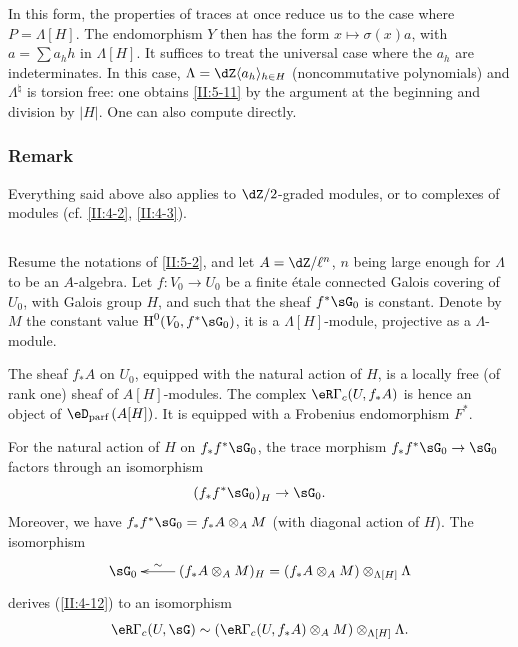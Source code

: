 In this form, the properties of traces at once reduce us to the
case where $P=\Lambda[H]$. The endomorphism $Y$ then has the form
$x\mapsto \sigma(x) a$, with $a=\sum a_h h$ in $\Lambda[H]$. It suffices to
treat the universal case where the $a_h$ are indeterminates. In this
case, $\Lambda=\dZ\langle a_h\rangle_{h\in H}$ (noncommutative polynomials) and
$\Lambda^\natural$ is torsion free: one obtains \ref{II:5-11} by the argument
at the beginning and division by $|H|$. One can also compute directly.




\subsubsection{Remark}\label{II:5-11-1}

Everything said above also applies to
$\dZ/2$-graded modules, or to complexes of modules (cf. \ref{II:4-2}, \ref{II:4-3}).




\subsection{}\label{II:5-12}

Resume the notations of \ref{II:5-2}, and let $A=\dZ/\ell^n$, $n$ being
large enough for $\Lambda$ to be an $A$-algebra. Let $f:V_0\to U_0$ be a
finite \'etale connected Galois covering of $U_0$, with Galois group
$H$, and such that the sheaf $f^*\sG_0$ is constant. Denote by $M$ the constant
value $\h^0(V_0,f^*\sG_0)$, it is a $\Lambda[H]$-module, projective as
a $\Lambda$-module.

The sheaf $f_* A$ on $U_0$, equipped with the natural action of $H$, is a
locally free (of rank one) sheaf of $A[H]$-modules. The complex
$\eR\Gamma_c(U,f_* A)$ is hence an object of $\eD_\text{parf}\left(A[H]\right)$. It
is equipped with a Frobenius endomorphism $F^*$.

For the natural action of $H$ on $f_* f^*\sG_0$, the trace morphism
$f_* f^*\sG_0\to\sG_0$ factors through an isomorphism
\[
  \left(f_* f^*\sG_0\right)_H \to \sG_0 \text{.}
\]
Moreover, we have $f_* f^*\sG_0=f_* A\otimes_A M$ (with diagonal action of
$H$). The isomorphism
\[\xymatrix{
  \sG_0
    & \ar[l]_-\sim (f_* A\otimes_A M)_H = (f_* A\otimes_A M)\otimes_{\Lambda[H]} \Lambda
}\]
derives (\ref{II:4-12}) to an isomorphism
\[
  \eR\Gamma_c(U,\sG) \sim \left(\eR\Gamma_c(U,f_* A)\otimes_A M\right)\otimes_{\Lambda[H]} \Lambda \text{.}
\]

